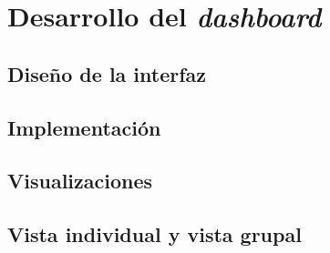 \chapter{Desarrollo del \textit{dashboard}}
\label{ch:dashboard}


\section{Diseño de la interfaz}
\label{sec:diseno_interfaz}

\section{Implementación}
\label{sec:implementacion_dashboard}

\section{Visualizaciones}
\label{sec:visualizaciones}

\section{Vista individual y vista grupal}
\label{sec:vistas}
